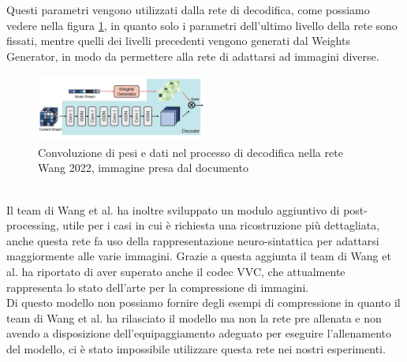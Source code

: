 Questi parametri vengono utilizzati dalla rete di decodifica, come possiamo vedere nella figura \ref{fig:Wang2022Convolution}, in quanto solo i parametri dell’ultimo livello della rete sono fissati, mentre quelli dei livelli precedenti vengono generati dal Weights Generator, in modo da permettere alla rete di adattarsi ad immagini diverse.\\
\begin{figure}[!h]
    \centering
    \includegraphics[width=0.5\textwidth]{Immagini/Wang2022_Convolution.png}
    \caption{Convoluzione di pesi e dati nel processo di decodifica nella rete Wang 2022, immagine presa dal documento \cite{wang2022neural}}
    \label{fig:Wang2022Convolution}
\end{figure}\\
Il team di Wang et al. ha inoltre sviluppato un modulo aggiuntivo di post-processing, utile per i casi in cui è richiesta una ricostruzione più dettagliata, anche questa rete fa uso della rappresentazione neuro-sintattica per adattarsi maggiormente alle varie immagini. Grazie a questa aggiunta il team di Wang et al. ha riportato di aver superato anche il codec VVC, che attualmente rappresenta lo stato dell’arte per la compressione di immagini.\\
Di questo modello non possiamo fornire degli esempi di compressione in quanto il team di Wang et al. \cite{wang2022neural} ha rilasciato il modello ma non la rete pre allenata e non avendo a disposizione dell'equipaggiamento adeguato per eseguire l'allenamento del modello, ci è stato impossibile utilizzare questa rete nei nostri esperimenti.\\


